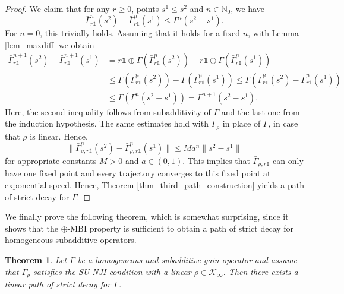 \documentclass[10pt, oneside, a4paper]{article}
\newcommand{\N}{\mathbb{N}}
\newcommand{\unit}{\mathds{1}}
\newcommand{\KC}{\mathcal{K}}
\newcommand{\bsign}[1]{\bar{#1}}
\newtheorem{theorem}{Theorem}[section]
\begin{document}
\begin{proof}
We claim that for any $r \geq 0$, points $s^1 \leq s^2$ and $n \in \N_0$, we have%
\begin{equation}\label{eq_subadd_contraction}
  \bsign{\Gamma}^n_{r\unit}(s^2) - \bsign{\Gamma}^n_{r\unit}(s^1) \leq \Gamma^n(s^2 - s^1).%
\end{equation}
For $n = 0$, this trivially holds. Assuming that it holds for a fixed $n$, with Lemma \ref{lem_maxdiff} we obtain%
\begin{align*}
  \bsign{\Gamma}^{n+1}_{r\unit}(s^2) - \bsign{\Gamma}^{n+1}_{r\unit}(s^1) &= r\unit \oplus \Gamma(\bsign{\Gamma}_{r\unit}^n(s^2)) - r\unit \oplus \Gamma(\bsign{\Gamma}_{r\unit}^n(s^1)) \\
	&\leq \Gamma(\bsign{\Gamma}_{r\unit}^n(s^2)) - \Gamma(\bsign{\Gamma}_{r\unit}^n(s^1)) \leq \Gamma(\bsign{\Gamma}_{r\unit}^n(s^2) - \bsign{\Gamma}_{r\unit}^n(s^1)) \\
	&\leq \Gamma(\Gamma^n(s^2 - s^1)) = \Gamma^{n+1}(s^2 - s^1).%
\end{align*}
Here, the second inequality follows from subadditivity of $\Gamma$ and the last one from the induction hypothesis. The same estimates hold with $\Gamma_{\rho}$ in place of $\Gamma$, in case that $\rho$ is linear. Hence,%
\begin{equation*}
  \|\bsign{\Gamma}^n_{\rho,r\unit}(s^2) - \bsign{\Gamma}^n_{\rho,r\unit}(s^1)\| \leq Ma^n \|s^2 - s^1\|%
\end{equation*}
for appropriate constants $M > 0$ and $a \in (0,1)$. This implies that $\bsign{\Gamma}_{\rho,r\unit}$ can only have one fixed point and every trajectory converges to this fixed point at exponential speed. Hence, Theorem \ref{thm_third_path_construction} yields a path of strict decay for $\Gamma$.
\end{proof}

We finally prove the following theorem, which is somewhat surprising, since it shows that the $\oplus$-MBI property is sufficient to obtain a path of strict decay for homogeneous subadditive operators.%

\begin{theorem}\label{thm_homogenenous_subadditive_2}
Let $\Gamma$ be a homogeneous and subadditive gain operator and assume that $\Gamma_{\rho}$ satisfies the SU-NJI condition with a linear $\rho \in \KC_{\infty}$. Then there exists a linear path of strict decay for $\Gamma$.
\end{theorem}
\end{document}

